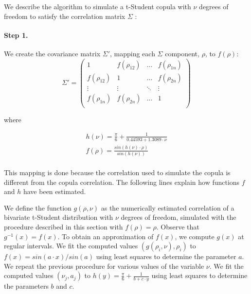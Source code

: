 \documentclass[a4paper,12pt,final]{article}
\begin{document}
We describe the algorithm to simulate a t-Student copula with $\nu$ degrees of freedom
to satisfy the correlation matrix $\Sigma$ \cite{copu:pricing}:

\paragraph{Step 1.} We create the covariance matrix $\Sigma'$, mapping 
each $\Sigma$ component, $\rho$, to $f(\rho)$:
\begin{displaymath}
\Sigma' = \left( 
\begin{array}{cccc}
1            & f(\rho_{12}) & \ldots & f(\rho_{1n})\\
f(\rho_{12}) & 1            & \ldots & f(\rho_{2n})\\
\vdots       & \vdots       & \ddots & \vdots      \\
f(\rho_{1n}) & f(\rho_{2n}) & \ldots & 1           \\
\end{array}
\right)
\end{displaymath}

where

\begin{displaymath}
\begin{array}{l}
h(\nu) = \frac{\pi}{6} + \frac{1}{0.44593 + 1.3089 \cdot \nu } \\
f(\rho) = \frac{sin(h(\nu) \cdot \rho)}{sin(h(\nu))} \\
\end{array}
\end{displaymath}
\newline

This mapping is done because the correlation used to simulate the copula 
is different from the copula correlation. The following lines explain how functions 
$f$ and $h$ have been estimated.
\newline

We define the function $g(\rho, \nu)$ as the numerically estimated correlation of 
a bivariate t-Student distribution with $\nu$ degrees of freedom, simulated with the procedure 
described in this section with $f(\rho)=\rho$. Observe that $g^{-1}(x) = f(x)$.
To obtain an approximation of $f(x)$, we compute $g(x)$ at regular intervals. We fit 
the computed values $(g(\rho_i,\nu), \rho_i)$ to $f(x)=sin(a \cdot x)/sin(a)$ using 
least squares to determine the parameter $a$. We repeat the previous procedure for 
various values of the variable $\nu$. We fit the computed values $(\nu_j, a_j)$ to 
$h(y) = \frac{\pi}{6} + \frac{1}{b + c \cdot y }$ using least squares
to determine the parameters $b$ and $c$.
\end{document}
